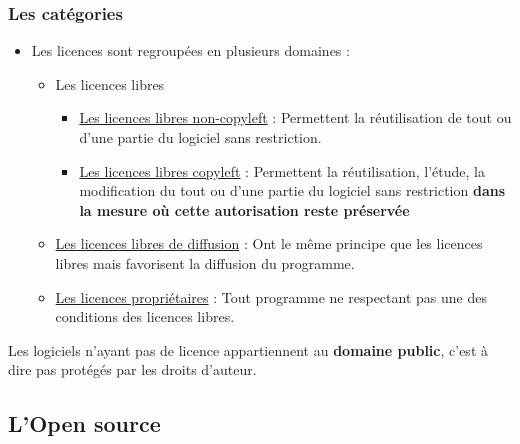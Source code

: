 \documentclass{beamer}
\begin{document}
\begin{frame}
	\frametitle{Les catégories}
	\begin{itemize}
		\item Les licences sont regroupées en plusieurs domaines : 
		\pause
		\begin{itemize}
			\item\footnotesize Les licences libres
			\pause
			\begin{itemize}
				\item\footnotesize \underline{Les licences libres non-copyleft} : Permettent la réutilisation de tout ou d'une partie du logiciel sans restriction.
				\item\footnotesize \underline{Les licences libres copyleft} : Permettent la réutilisation, l'étude, la modification du tout ou d'une partie du logiciel sans restriction \textbf{dans la mesure où cette autorisation reste préservée}
			\end{itemize}
			\pause
			\item\footnotesize \underline{Les licences libres de diffusion} : Ont le même principe que les licences libres mais favorisent la diffusion du programme.
			\pause
			\item\footnotesize \underline{Les licences propriétaires} : Tout programme ne respectant pas une des conditions des licences libres.
		\end{itemize}
	\end{itemize}
	\pause
	Les logiciels n'ayant pas de licence appartiennent au \textbf{domaine public}, c'est à dire pas protégés par les droits d'auteur.
\end{frame}

\subsection[L'Open source]{L'Open source}
\end{document}
